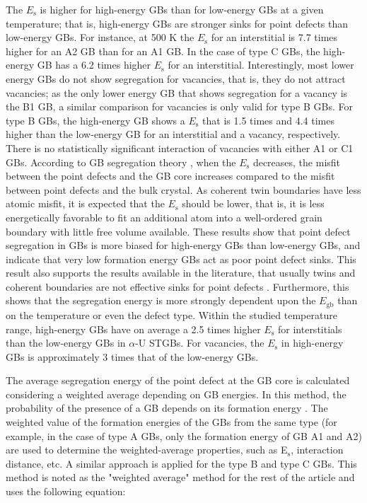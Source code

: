 \documentclass[review]{elsarticle}
\begin{document}
The $E_{\mathrm{s}}$ is higher for high-energy GBs than for low-energy GBs at a given temperature; that is, high-energy GBs are stronger sinks for point defects than low-energy GBs. For instance, at 500 K the $E_{\mathrm{s}}$ for an interstitial is 7.7 times higher for an A2 GB than for an A1 GB. In the case of type C GBs, the high-energy GB has a 6.2 times higher $E_{\mathrm{s}}$ for an interstitial. Interestingly, most lower energy GBs do not show segregation for vacancies, that is, they do not attract vacancies; as the only lower energy GB that shows segregation for a vacancy is the B1 GB, a similar comparison for vacancies is only valid for type B GBs. For type B GBs, the high-energy GB shows a $E_{\mathrm{s}}$ that is 1.5 times and 4.4 times higher than the low-energy GB for an interstitial and a vacancy, respectively. There is no statistically significant interaction of vacancies with either A1 or C1 GBs. According to GB segregation theory \cite{MISHIN_gb_diff}, when the $E_{\mathrm{s}}$ decreases, the misfit between the point defects and the GB core increases compared to the misfit between point defects and the bulk crystal. As coherent twin boundaries have less atomic misfit, it is expected that the $E_{\mathrm{s}}$ should be lower, that is, it is less energetically favorable to fit an additional atom into a well-ordered grain boundary with little free volume available. These results show that point defect segregation in GBs is more biased for high-energy GBs than low-energy GBs, and indicate that very low formation energy GBs act as poor point defect sinks. This result also supports the results available in the literature, that usually twins and coherent boundaries are not effective sinks for point defects \cite{Nabarro}. Furthermore, this shows that the segregation energy is more strongly dependent upon the  $E_{\mathrm{gb}}$  than on the temperature or even the defect type. Within the studied temperature range, high-energy GBs have on average a 2.5 times higher $E_{\mathrm{s}}$ for interstitials than the low-energy GBs in $\alpha$-U STGBs. For vacancies, the $E_{\mathrm{s}}$ in high-energy GBs is approximately 3 times that of the low-energy GBs.

The average segregation energy of the point defect at the GB core is calculated considering a weighted average depending on GB energies. In this method, the probability of the presence of a GB depends on its formation energy \cite{WILLIAMS201545}. The weighted value of the formation energies of the GBs from the same type (for example, in the case of type A GBs, only the formation energy of GB A1 and A2) are used to determine the weighted-average properties, such as E$_\mathrm{s}$, interaction distance, etc. A similar approach is applied for the type B and type C GBs. This method is noted as the "weighted average" method for the rest of the article and uses the following equation:
\end{document}
